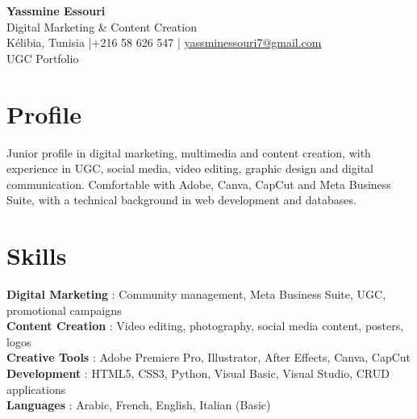 \documentclass[a4paper,10pt]{article}
\begin{document}
\begin{center}
  {\LARGE\bfseries\color{navy} Yassmine Essouri}\\[4pt]
  {\large Digital Marketing \& Content Creation}\\[6pt]
  \normalsize
  Kélibia, Tunisia \quad|\quad +216 58 626 547 \quad|\quad
  \href{mailto:yassminessouri7@gmail.com}{yassminessouri7@gmail.com}\\[2pt]
  UGC Portfolio
\end{center}
\vspace{3pt}
\section{Profile}
Junior profile in digital marketing, multimedia and content creation, with experience in UGC, social media, video editing, graphic design and digital communication. Comfortable with Adobe, Canva, CapCut and Meta Business Suite, with a technical background in web development and databases.
\section{Skills}
\textbf{Digital Marketing} : Community management, Meta Business Suite, UGC, promotional campaigns\\[1pt]
\textbf{Content Creation} : Video editing, photography, social media content, posters, logos\\[1pt]
\textbf{Creative Tools} : Adobe Premiere Pro, Illustrator, After Effects, Canva, CapCut\\[1pt]
\textbf{Development} : HTML5, CSS3, Python, Visual Basic, Visual Studio, CRUD applications\\[1pt]
\textbf{Languages} : Arabic, French, English, Italian (Basic)
\end{document}
